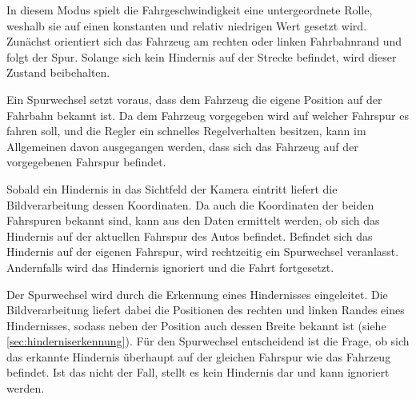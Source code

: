 In diesem Modus spielt die Fahrgeschwindigkeit eine untergeordnete Rolle, weshalb sie auf einen konstanten und relativ niedrigen Wert gesetzt wird. Zunächst orientiert sich das Fahrzeug am rechten oder linken Fahrbahnrand und folgt der Spur. Solange sich kein Hindernis auf der Strecke befindet, wird dieser Zustand beibehalten. 

Ein Spurwechsel setzt voraus, dass dem Fahrzeug die eigene Position auf der Fahrbahn bekannt ist. Da dem Fahrzeug vorgegeben wird auf welcher Fahrspur es fahren soll, und die Regler ein schnelles Regelverhalten besitzen, kann im Allgemeinen davon ausgegangen werden, dass sich das Fahrzeug auf der vorgegebenen Fahrspur befindet.

Sobald ein Hindernis in das Sichtfeld der Kamera eintritt liefert die Bildverarbeitung dessen Koordinaten. Da auch die Koordinaten der beiden Fahrspuren bekannt sind, kann aus den Daten ermittelt werden, ob sich das Hindernis auf der aktuellen Fahrspur des Autos befindet. Befindet sich das Hindernis auf der eigenen Fahrspur, wird rechtzeitig ein Spurwechsel veranlasst. Andernfalls wird das Hindernis ignoriert und die Fahrt fortgesetzt.

Der Spurwechsel wird durch die Erkennung eines Hindernisses eingeleitet. Die Bildverarbeitung liefert dabei die Positionen des rechten und linken Randes eines Hindernisses, sodass neben der Position auch dessen Breite bekannt ist (siehe \autoref{sec:hinderniserkennung}). Für den Spurwechsel entscheidend ist die Frage, ob sich das erkannte Hindernis überhaupt auf der gleichen Fahrspur wie das Fahrzeug befindet. Ist das nicht der Fall, stellt es kein Hindernis dar und kann ignoriert werden.

\begin{lstlisting}

\end{lstlisting}

